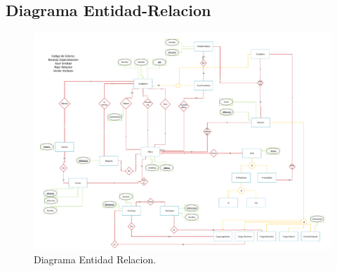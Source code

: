 \subsection{Diagrama Entidad-Relacion}
\begin{landscape}
	\begin{figure}[t]
	  \centering	
		\includegraphics[scale=0.50]{fig/der.pdf}
	  \caption{Diagrama Entidad Relacion.}
	\end{figure}
\end{landscape}